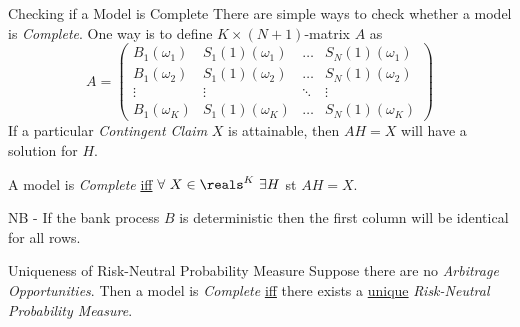 \documentclass[11pt,a4paper]{article}
\begin{document}
  \begin{remark}{Checking if a Model is Complete}
    There are simple ways to check whether a model is \textit{Complete}. One way is to define $K\times(N+1)$-matrix $A$ as
    \[A=\begin{pmatrix}
        B_1(\omega_1)&S_1(1)(\omega_1)&\dots&S_N(1)(\omega_1)\\
        B_1(\omega_2)&S_1(1)(\omega_2)&\dots&S_N(1)(\omega_2)\\
        \vdots&\vdots&\ddots&\vdots\\
        B_1(\omega_K)&S_1(1)(\omega_K)&\dots&S_N(1)(\omega_K)
    \end{pmatrix}\]
    If a particular \textit{Contingent Claim} $X$ is attainable, then $AH=X$ will have a solution for $H$.
    \par A model is \textit{Complete} \underline{iff} $\forall\ X\in\reals^K\ \exists H$ st $AH=X$.
    \par NB - If the bank process $B$ is deterministic then the first column will be identical for all rows.
  \end{remark}

  \begin{theorem}{Uniqueness of Risk-Neutral Probability Measure}\label{thrm_uniqueness_of_risk_neutral_probability_measure}
    Suppose there are no \textit{Arbitrage Opportunities}. Then a model is \textit{Complete} \underline{iff} there exists a \underline{unique} \textit{Risk-Neutral Probability Measure}.
  \end{theorem}
\end{document}
